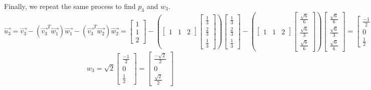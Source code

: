 \begin{enumerate}
{    Finally, we repeat the same process to find $p_3$ and $w_3$.
    \[\vec{u_3} = \vec{v_3} - (\vec{v_3}^T\vec{w_1})\vec{w_1} - (\vec{v_3}^T\vec{w_2})\vec{w_2} = \begin{bmatrix}1\\1\\2\end{bmatrix} - (\begin{bmatrix}1 & 1 & 2\end{bmatrix}\begin{bmatrix}\frac{1}{3}\\\frac{2}{3}\\\frac{1}{3}\end{bmatrix})\begin{bmatrix}\frac{1}{3}\\\frac{2}{3}\\\frac{1}{3}\end{bmatrix} - (\begin{bmatrix}1 & 1 & 2\end{bmatrix}\begin{bmatrix}\frac{\sqrt{6}}{6}\\\frac{\sqrt{6}}{3}\\\frac{\sqrt{6}}{6}\end{bmatrix})\begin{bmatrix}\frac{\sqrt{6}}{6}\\\frac{\sqrt{6}}{3}\\\frac{\sqrt{6}}{6}\end{bmatrix} = \begin{bmatrix}\frac{-1}{2}\\0\\\frac{1}{2}\end{bmatrix}\]
    \[w_3 = \sqrt{2}\begin{bmatrix}\frac{-1}{2}\\0\\\frac{1}{2}\end{bmatrix} = \begin{bmatrix}\frac{-\sqrt{2}}{2}\\0\\\frac{\sqrt{2}}{2}\end{bmatrix}\]}
\empt{\newpage}
\end{enumerate}